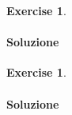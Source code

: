 \documentclass{article}
\theoremstyle{plain}
\theoremstyle{definition}
\newtheorem{xca}[exmp]{Exercise}
\theoremstyle{remark}
\begin{document}
\vspace{10pt}

\begin{bxthm}
\begin{xca}

\end{xca}
\end{bxthm}
\paragraph{Soluzione}

\vspace{10pt}

\begin{bxthm}
\begin{xca}

\end{xca}
\end{bxthm}
\paragraph{Soluzione}
\end{document}
